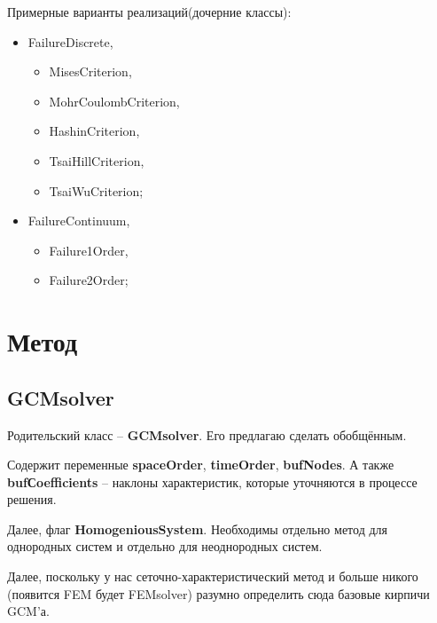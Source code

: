 \documentclass[a4paper,12pt]{article}
\numberwithin{equation}{section}
\begin{document}
	Примерные варианты реализаций(дочерние классы):
	\begin{itemize}
		\item{FailureDiscrete,}
		\begin{itemize}
			\item{MisesCriterion,}
			\item{MohrCoulombCriterion,}
			\item{HashinCriterion,}
			\item{TsaiHillCriterion,}
			\item{TsaiWuCriterion;}
		\end{itemize}
		\item{FailureContinuum,}
		\begin{itemize}
			\item{Failure1Order,}
			\item{Failure2Order;}
		\end{itemize}
	\end{itemize}
	
\section{Метод}
\subsection{GCMsolver}
	Родительский класс -- \textbf{GCMsolver}. Его предлагаю сделать обобщённым.
	
	Содержит переменные \textbf{spaceOrder}, \textbf{timeOrder}, \textbf{bufNodes}.
	А также \textbf{bufСoefficients} -- наклоны характеристик, которые уточняются в процессе решения.
	
	Далее, флаг \textbf{HomogeniousSystem}. Необходимы отдельно метод для однородных систем и отдельно для неоднородных систем.
	
	Далее, поскольку у нас сеточно-характеристический метод и больше никого (появится FEM будет FEMsolver) разумно определить сюда базовые кирпичи GCM'а.
	
\end{document}
